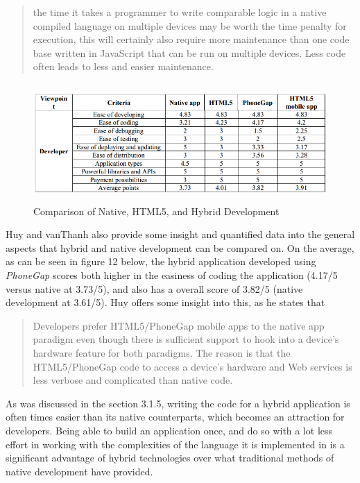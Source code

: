\documentclass[11pt, twocolumn]{article}
\begin{document}
\begin{quote}
the time it takes a programmer to write comparable logic in a native compiled language on multiple devices may be worth the time penalty for execution, this will certainly also require more maintenance than one code base written in JavaScript that can be run on multiple devices.  Less code often leads to less and easier maintenance. ~\cite{Leroux2011}
\end{quote}

\begin{figure}
\includegraphics[width=\textwidth, height=4.5cm]{hybrid-native-compare-table}
\caption{Comparison of Native, HTML5, and Hybrid Development ~\cite{Huy2012}}
\end{figure}

Huy and vanThanh also provide some insight and quantified data into the general aspects that hybrid and native development can be compared on.  On the average, as can be seen in figure 12 below, the hybrid application developed using {\it PhoneGap} scores both higher in the easiness of coding the application (4.17/5 versus native at 3.73/5), and also has a overall score of 3.82/5 (native development at 3.61/5). Huy offers some insight into this, as he states that

\begin{quote}
Developers prefer HTML5/PhoneGap mobile apps to the native app paradigm even though there is sufficient support to hook into a device's hardware feature for both paradigms.  The reason is that the HTML5/PhoneGap code to access a device's hardware and Web services is less verbose and complicated than native code.
\end{quote}

As was discussed in the section 3.1.5, writing the code for a hybrid application is often times easier than its native counterparts, which becomes an attraction for developers.  Being able to build an application once, and do so with a lot less effort in working with the complexities of the language it is implemented in is a significant advantage of hybrid technologies over what traditional methods of native development have provided.
\end{document}

